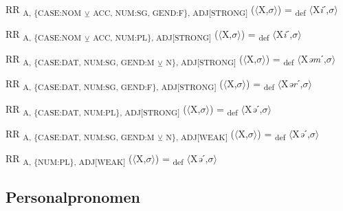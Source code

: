 {\begin{exe}
 RR \textsubscript{A, \{CASE:NOM} \textsubscript{${\veebar}$}\textsubscript{ ACC, NUM:SG, GEND:F\}, ADJ[STRONG]} ($\langle$X,$\sigma $$\rangle$) = \textsubscript{def} $\langle$X\textit{i}ˊ,$\sigma $$\rangle$
\end{exe}

\begin{exe}
 RR \textsubscript{A, \{CASE:NOM} \textsubscript{${\veebar}$}\textsubscript{ ACC, NUM:PL\}, ADJ[STRONG]} ($\langle$X,$\sigma $$\rangle$) = \textsubscript{def} $\langle$X\textit{i}ˊ,$\sigma $$\rangle$
\end{exe}

\begin{exe}
 RR \textsubscript{A, \{CASE:DAT, NUM:SG, GEND:M} \textsubscript{${\veebar}$}\textsubscript{ N\}, ADJ[STRONG]} ($\langle$X,$\sigma $$\rangle$) = \textsubscript{def} $\langle$X\textit{əm}ˊ,$\sigma $$\rangle$
\end{exe}

\begin{exe}
 RR \textsubscript{A, \{CASE:DAT, NUM:SG, GEND:F\}, ADJ[STRONG]} ($\langle$X,$\sigma $$\rangle$) = \textsubscript{def} $\langle$X\textit{ər}ˊ,$\sigma $$\rangle$
\end{exe}

\begin{exe}
 RR \textsubscript{A, \{CASE:DAT, NUM:PL\}, ADJ[STRONG]} ($\langle$X,$\sigma $$\rangle$) = \textsubscript{def} $\langle$X\textit{ə}ˊ,$\sigma $$\rangle$
\end{exe}

\begin{exe}
 RR \textsubscript{A, \{CASE:DAT, NUM:SG, GEND:M} \textsubscript{${\veebar}$}\textsubscript{ N\}, ADJ[WEAK]} ($\langle$X,$\sigma $$\rangle$) = \textsubscript{def} $\langle$X\textit{ə}ˊ,$\sigma $$\rangle$
\end{exe}

\begin{exe}
 RR \textsubscript{A, \{NUM:PL\}, ADJ[WEAK]} ($\langle$X,$\sigma $$\rangle$) = \textsubscript{def} $\langle$X\textit{ə}ˊ,$\sigma $$\rangle$
\end{exe}

\subsection{Personalpronomen}

}
